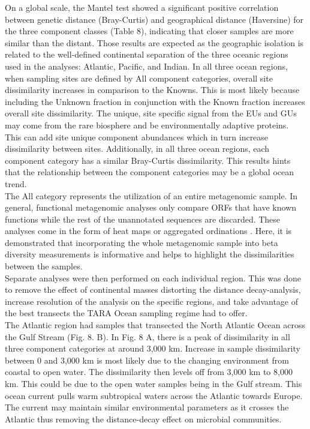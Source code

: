 On a global scale, the Mantel test showed a significant positive correlation between genetic distance (Bray-Curtis) and geographical distance (Haversine) for the three component classes (Table 8), indicating that closer samples are more similar than the distant. Those results are expected as the geographic isolation is related to the well-defined continental separation of the three oceanic regions used in the analyses: Atlantic, Pacific, and Indian. In all three ocean regions, when sampling sites are defined by All component categories, overall site dissimilarity increases in comparison to the Knowns. This is most likely because including the Unknown fraction in conjunction with the Known fraction increases overall site dissimilarity. The unique, site specific signal from the EUs and GUs may come from the rare biosphere and be environmentally adaptive proteins. This can add site unique component abundances which in turn increase dissimilarity between sites. Additionally, in all three ocean regions, each component category has a similar Bray-Curtis dissimilarity. This results hints that the relationship between the component categories may be a global ocean trend.\\

The All category represents the utilization of an entire metagenomic sample. In general, functional metagenomic analyses only compare ORFs that have known functions while the rest of the unannotated sequences are discarded. These analyses come in the form of heat maps \citep{McMahon_2015} or aggregated ordinations \citep{Louca_2016}. Here, it is demonstrated that incorporating the whole metagenomic sample into beta diversity measurements is informative and helps to highlight the dissimilarities between the samples.\\

Separate analyses were then performed on each individual region. This was done to remove the effect of continental masses distorting the distance decay-analysis, increase resolution of the analysis on the specific regions, and take advantage of the best transects the TARA Ocean sampling regime had to offer.\\

The Atlantic region had samples that transected the North Atlantic Ocean across the Gulf Stream (Fig. 8. B). In Fig. 8 A, there is a peak of dissimilarity in all three component categories at around 3,000 km. Increase in sample dissimilarity between 0 and 3,000 km is most likely due to the changing environment from coastal to open water. The dissimilarity then levels off from 3,000 km to 8,000 km. This could be due to the open water samples being in the Gulf stream. This ocean current pulls warm subtropical waters across the Atlantic towards Europe. The current may maintain similar environmental parameters as it crosses the Atlantic thus removing the distance-decay effect on microbial communities.\\

